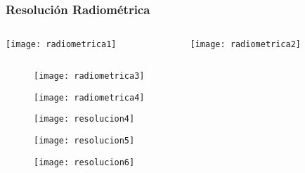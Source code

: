 \documentclass[14pt]{beamer}
\begin{document}
\begin{frame}
\frametitle{Resolución Radiométrica}
  \begin{columns}
		\begin{column}{.7\linewidth}
		 \texttt{[image: radiometrica1]}
		\end{column}
		\begin{column}{.3\linewidth}
\texttt{[image: radiometrica2]}
		\end{column}
	\end{columns}
\end{frame}
\begin{frame}
 \begin{figure}
    \centering
    \texttt{[image: radiometrica3]}
  \end{figure}
\end{frame}
\begin{frame}
 \begin{figure}
    \centering
    \texttt{[image: radiometrica4]}
  \end{figure}
\end{frame}
\begin{frame}
 \begin{figure}
    \centering
    \texttt{[image: resolucion4]}
  \end{figure}
\end{frame}
\begin{frame}
 \begin{figure}
    \centering
    \texttt{[image: resolucion5]}
  \end{figure}
\end{frame}
\begin{frame}
 \begin{figure}
    \centering
    \texttt{[image: resolucion6]}
  \end{figure}
\end{frame}
\end{document}
